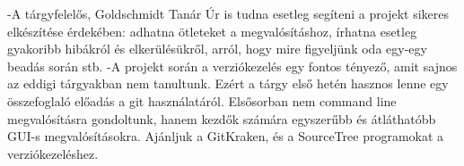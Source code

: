 \begin{itemize}
    -A tárgyfelelős, Goldschmidt Tanár Úr is tudna esetleg segíteni a projekt sikeres elkészítése érdekében: adhatna ötleteket a megvalósításhoz, írhatna esetleg gyakoribb hibákról és elkerülésükről, arról, hogy mire figyeljünk oda egy-egy beadás során stb. 
    -A projekt során a verziókezelés egy fontos tényező, amit sajnos az eddigi tárgyakban nem tanultunk. Ezért a tárgy első hetén hasznos lenne egy összefoglaló előadás a git használatáról. Elsősorban nem command line megvalósításra gondoltunk, hanem kezdők számára egyszerűbb és átláthatóbb GUI-s megvalósításokra. Ajánljuk a GitKraken, és a SourceTree programokat a verziókezeléshez.
\end{itemize}


